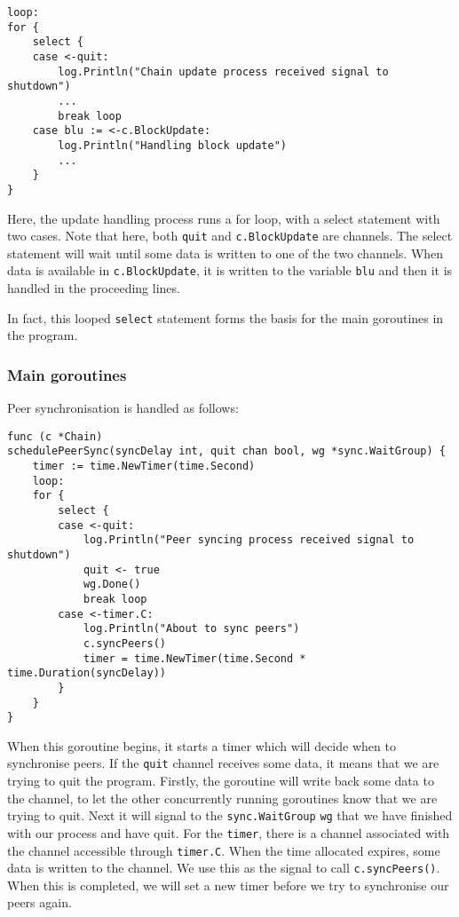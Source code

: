 \documentclass[a4paper,12pt]{article}
\begin{document}
\begin{Verbatim}[obeytabs,tabsize=4]
loop:
for {
    select {
    case <-quit:
        log.Println("Chain update process received signal to shutdown")
        ...
        break loop
    case blu := <-c.BlockUpdate:
        log.Println("Handling block update")
        ...
    }
}
\end{Verbatim}

Here, the update handling process runs a for loop, with a select statement with two cases. Note that here, both \verb|quit| and \verb|c.BlockUpdate| are channels. The select statement will wait until some data is written to one of the two channels. When data is available in \verb|c.BlockUpdate|, it is written to the variable \verb|blu| and then it is handled in the proceeding lines.


In fact, this looped \verb|select| statement forms the basis for the main goroutines in the program.

\subsubsection{Main goroutines}
Peer synchronisation is handled as follows:
\begin{Verbatim}[obeytabs,tabsize=4]
func (c *Chain)
schedulePeerSync(syncDelay int, quit chan bool, wg *sync.WaitGroup) {
    timer := time.NewTimer(time.Second)
    loop:
    for {
        select {
        case <-quit:
            log.Println("Peer syncing process received signal to shutdown")
            quit <- true
            wg.Done()
            break loop
        case <-timer.C:
            log.Println("About to sync peers")
            c.syncPeers()
            timer = time.NewTimer(time.Second * time.Duration(syncDelay))
        }
    }
}
\end{Verbatim}

When this goroutine begins, it starts a timer which will decide when to synchronise peers. If the \verb|quit| channel receives some data, it means that we are trying to quit the program. Firstly, the goroutine will write back some data to the channel, to let the other concurrently running goroutines know that we are trying to quit. Next it will signal to the \verb|sync.WaitGroup| \verb|wg| that we have finished with our process and have quit. For the \verb|timer|, there is a channel associated with the channel accessible through \verb|timer.C|. When the time allocated expires, some data is written to the channel. We use this as the signal to call \verb|c.syncPeers()|. When this is completed, we will set a new timer before we try to synchronise our peers again.
\end{document}
